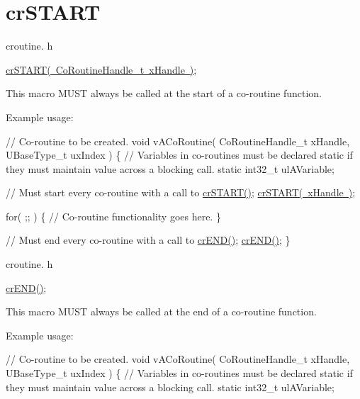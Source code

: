 \hypertarget{group__cr_s_t_a_r_t}{}\section{cr\+S\+T\+A\+RT}
\label{group__cr_s_t_a_r_t}
croutine. h 
\begin{DoxyPre}
\mbox{\hyperlink{croutine_8h_a19a57a201a325e8af1207ed68c4aedde}{crSTART( CoRoutineHandle\_t xHandle )}};\end{DoxyPre}


This macro M\+U\+ST always be called at the start of a co-\/routine function.

Example usage\+: 
\begin{DoxyPre}
// Co-routine to be created.
void vACoRoutine( CoRoutineHandle\_t xHandle, UBaseType\_t uxIndex )
\{
// Variables in co-routines must be declared static if they must maintain value across a blocking call.
static int32\_t ulAVariable;\end{DoxyPre}



\begin{DoxyPre}    // Must start every co-routine with a call to \mbox{\hyperlink{croutine_8h_a19a57a201a325e8af1207ed68c4aedde}{crSTART()}};
    \mbox{\hyperlink{croutine_8h_a19a57a201a325e8af1207ed68c4aedde}{crSTART( xHandle )}};\end{DoxyPre}



\begin{DoxyPre}    for( ;; )
    \{
         // Co-routine functionality goes here.
    \}\end{DoxyPre}



\begin{DoxyPre}    // Must end every co-routine with a call to \mbox{\hyperlink{croutine_8h_ae6038cc976689b50000475ebfc4e2f23}{crEND()}};
    \mbox{\hyperlink{croutine_8h_ae6038cc976689b50000475ebfc4e2f23}{crEND()}};
\}\end{DoxyPre}


croutine. h 
\begin{DoxyPre}
\mbox{\hyperlink{croutine_8h_ae6038cc976689b50000475ebfc4e2f23}{crEND()}};\end{DoxyPre}


This macro M\+U\+ST always be called at the end of a co-\/routine function.

Example usage\+: 
\begin{DoxyPre}
// Co-routine to be created.
void vACoRoutine( CoRoutineHandle\_t xHandle, UBaseType\_t uxIndex )
\{
// Variables in co-routines must be declared static if they must maintain value across a blocking call.
static int32\_t ulAVariable;\end{DoxyPre}



